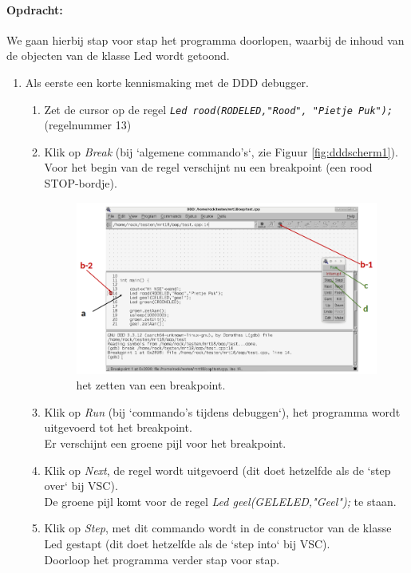 \paragraph{Opdracht:}
We gaan hierbij stap voor stap het programma doorlopen, waarbij de inhoud van de objecten van de klasse Led wordt getoond.

\begin{enumerate} [label=\alph*]
	\item Als eerste een korte kennismaking met de DDD debugger.
\begin{enumerate} [label=\roman*]

	\item Zet de cursor op de regel \texttt{\textit{Led rood(RODELED,"Rood", "Pietje Puk");}}
	(regelnummer 13)
	\item Klik op \textit{Break} (bij `algemene commando's`, zie Figuur \ref{fig:dddscherm1}). Voor het begin van de regel verschijnt nu een breakpoint (een rood STOP-bordje).

\begin{figure}[h!]
	\captionsetup{justification=centering}
	\includegraphics[width=0.7 \linewidth]{figuren/ddd_set_breakpoint}
	\centering
	\caption{het zetten van een breakpoint.}
	\label{fig:ddduitv1}
\end{figure}
	\item Klik op \textit{Run} (bij `commando's tijdens debuggen`),
het programma wordt uitgevoerd tot het breakpoint. \\Er verschijnt een groene pijl voor het breakpoint.
\item Klik op \textit{Next}, de regel wordt uitgevoerd (dit doet hetzelfde als de `step over` bij VSC). \\
De groene pijl komt voor de regel \textit{Led geel(GELELED,"Geel");} te staan. 
\item Klik op \textit{Step}, met dit commando wordt in de constructor van de klasse Led gestapt (dit doet hetzelfde als de `step into` bij VSC). \\Doorloop het programma verder stap voor stap.


\end{enumerate}
\end{enumerate}
